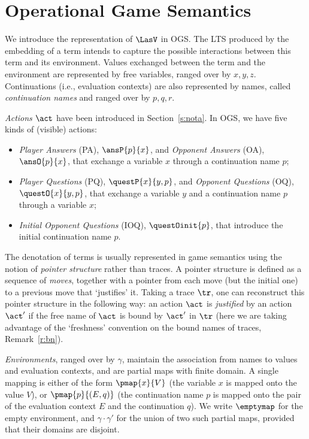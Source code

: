 \section{Operational Game Semantics}
\label{s:AOGS}
 
We introduce the representation of $\LasV$ in OGS. 
The LTS produced by the embedding of a term intends to capture the possible interactions 
between this term and its environment.
Values exchanged between the term and the environment are represented by free variables, 
ranged over by $x,y,z$. 
Continuations (i.e., evaluation contexts) are also
represented by names, called \emph{continuation names} and ranged over by  $p,q,r$.

\emph{Actions} $\act$ have been introduced in Section~\ref{s:nota}. 
In OGS, we have five kinds of (visible) actions:
\begin{itemize}
  \item \emph{Player Answers} (PA), $\ansP{p}{x}$,
  and \emph{Opponent Answers} (OA),  $\ansO{p}{x}$,
  that exchange a variable $x$ through a continuation name $p$;
  \item \emph{Player Questions} (PQ), $\questP{x}{y,p}$,
  and \emph{Opponent Questions} (OQ), $\questO{x}{y,p}$, 
  that exchange a variable $y$ and a continuation name $p$ through a variable $x$;
  \item \emph{Initial Opponent Questions} (IOQ), $\questOinit{p}$, that
  introduce the initial continuation name $p$.
\end{itemize}
 
\begin{remark}
 \label{rmk:justified-sequence}
The denotation of terms is usually represented in game semantics using 
the notion of \emph{pointer structure} rather than traces.
A pointer structure is defined as a sequence of \emph{moves}, 
together with a pointer from each move (but the initial one) to a previous move 
that  `justifies' it.
Taking a trace $\tr$, one can reconstruct this pointer structure in the following way:
an action $\act$ is \emph{justified} by an action $\act'$
if the free name of $\act$ is bound by $\act'$ in $\tr$ (here we are taking advantage of
the `freshness' convention on the bound names of traces, Remark~\ref{r:bn}).
\end{remark}


\emph{Environments}, ranged over by $\gamma$, 
maintain the association from names to values and evaluation contexts, and  
 are partial maps with finite domain. A single mapping is either of the form 
$\pmap{x}{V}$
(the variable $x$ is mapped onto the  value $V$), or 
$\pmap{p}{(E,q)}$ 
(the continuation name $p$ is mapped onto the 
pair of the  evaluation context $E$ and the continuation $q$).
We write $\emptymap$ for the empty environment,
and $\gamma \cdot \gamma'$ for the union of two such partial maps,
provided that their domains are disjoint.



